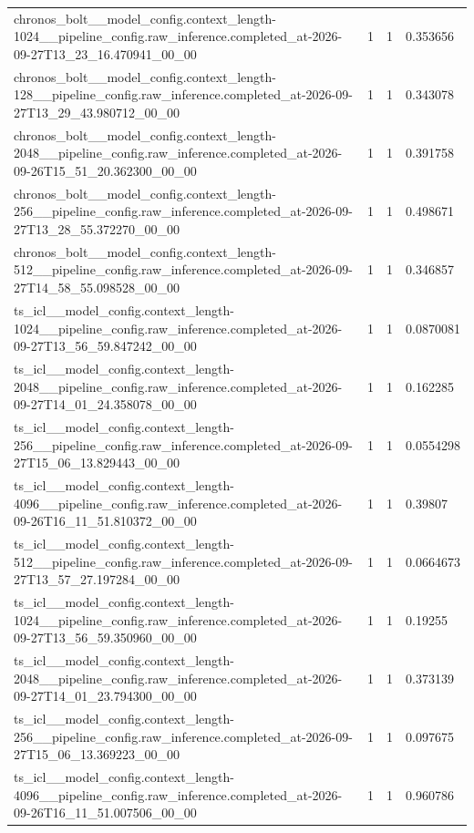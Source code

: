 \begin{tabular}{llll}
chronos\_bolt\_\_model\_config.context\_length-1024\_\_pipeline\_config.raw\_inference.completed\_at-2026-09-27T13\_23\_16.470941\_00\_00 & 1 & 1 & 0.353656 \\
chronos\_bolt\_\_model\_config.context\_length-128\_\_pipeline\_config.raw\_inference.completed\_at-2026-09-27T13\_29\_43.980712\_00\_00 & 1 & 1 & 0.343078 \\
chronos\_bolt\_\_model\_config.context\_length-2048\_\_pipeline\_config.raw\_inference.completed\_at-2026-09-26T15\_51\_20.362300\_00\_00 & 1 & 1 & 0.391758 \\
chronos\_bolt\_\_model\_config.context\_length-256\_\_pipeline\_config.raw\_inference.completed\_at-2026-09-27T13\_28\_55.372270\_00\_00 & 1 & 1 & 0.498671 \\
chronos\_bolt\_\_model\_config.context\_length-512\_\_pipeline\_config.raw\_inference.completed\_at-2026-09-27T14\_58\_55.098528\_00\_00 & 1 & 1 & 0.346857 \\
ts\_icl\_\_model\_config.context\_length-1024\_\_pipeline\_config.raw\_inference.completed\_at-2026-09-27T13\_56\_59.847242\_00\_00 & 1 & 1 & 0.0870081 \\
ts\_icl\_\_model\_config.context\_length-2048\_\_pipeline\_config.raw\_inference.completed\_at-2026-09-27T14\_01\_24.358078\_00\_00 & 1 & 1 & 0.162285 \\
ts\_icl\_\_model\_config.context\_length-256\_\_pipeline\_config.raw\_inference.completed\_at-2026-09-27T15\_06\_13.829443\_00\_00 & 1 & 1 & 0.0554298 \\
ts\_icl\_\_model\_config.context\_length-4096\_\_pipeline\_config.raw\_inference.completed\_at-2026-09-26T16\_11\_51.810372\_00\_00 & 1 & 1 & 0.39807 \\
ts\_icl\_\_model\_config.context\_length-512\_\_pipeline\_config.raw\_inference.completed\_at-2026-09-27T13\_57\_27.197284\_00\_00 & 1 & 1 & 0.0664673 \\
ts\_icl\_\_model\_config.context\_length-1024\_\_pipeline\_config.raw\_inference.completed\_at-2026-09-27T13\_56\_59.350960\_00\_00 & 1 & 1 & 0.19255 \\
ts\_icl\_\_model\_config.context\_length-2048\_\_pipeline\_config.raw\_inference.completed\_at-2026-09-27T14\_01\_23.794300\_00\_00 & 1 & 1 & 0.373139 \\
ts\_icl\_\_model\_config.context\_length-256\_\_pipeline\_config.raw\_inference.completed\_at-2026-09-27T15\_06\_13.369223\_00\_00 & 1 & 1 & 0.097675 \\
ts\_icl\_\_model\_config.context\_length-4096\_\_pipeline\_config.raw\_inference.completed\_at-2026-09-26T16\_11\_51.007506\_00\_00 & 1 & 1 & 0.960786 \\

\end{tabular}
